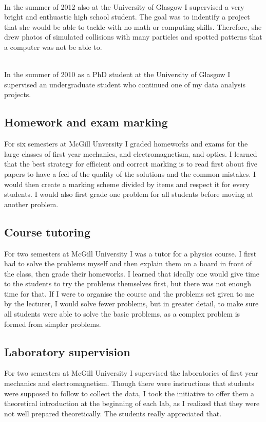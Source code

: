\documentclass[12pt]{article} %
\begin{document}
\ \\In the summer of 2012 also at the University of Glasgow I supervised a very bright and enthuastic high school student. The goal was to indentify a project that she would be able to tackle with no math or computing skills. Therefore, she drew photos of simulated collisions with many particles and spotted patterns that a computer was not be able to. 

\ \\In the summer of 2010 as a PhD student at the University of Glasgow I supervised an undergraduate student who continued one of my data analysis projects. 

\subsection{Homework and exam marking}

For six semesters at McGill Unversity I graded homeworks and exams for the large classes of first year mechanics, and electromagnetism, and optics. I learned that the best strategy for efficient and correct marking is to read first about five papers to have a feel of the quality of the solutions and the common mistakes. I would then create a marking scheme divided by items and respect it for every students. I would also first grade one problem for all students before moving at another problem. 

\subsection{Course tutoring}

For two semesters at McGill University I was a tutor for a physics course. I first had to solve the problems myself and then explain them on a board in front of the class, then grade their homeworks. I learned that ideally one would give time to the students to try the problems themselves first, but there was not enough time for that. If I were to organise the course and the problems set given to me by the lecturer, I would solve fewer problems, but in greater detail, to make sure all students were able to solve the basic problems, as a complex problem is formed from simpler problems. 

\subsection{Laboratory supervision}

For two semesters at McGill University I supervised the laboratories of first year mechanics and electromagnetism. Though there were instructions that students were supposed to follow to collect the data, I took the initiative to offer them a theoretical introduction at the beginning of each lab, as I realized that they were not well prepared theoretically. The students really appreciated that. 
\end{document}
